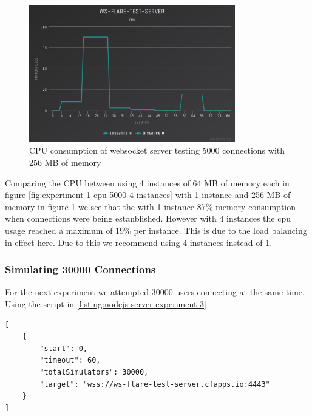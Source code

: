 \begin{figure}[H]
  \centering
    \includegraphics[width=0.8\textwidth]{figures/experiments/experiment-1/node-js/cpu-5000-256-memory.png}
    \caption{CPU consumption of websocket server testing 5000 connections with 256 MB of memory}
    \label{fig:experiment-1-cpu-5000-1-instances-256-mem}
\end{figure}

Comparing the CPU between using 4 instances of 64 MB of memory each in figure \ref{fig:experiment-1-cpu-5000-4-instances} with 1 instance and 256 MB of memory in figure \ref{fig:experiment-1-cpu-5000-1-instances-256-mem} we see that the with 1 instance 87\% memory consumption when connections were being estanblished. However with 4 instances the cpu usage reached a maximum of 19\% per instance. This is due to the load balancing in effect here. Due to this we recommend using 4 instances instead of 1. 

\subsubsection{Simulating 30000 Connections}

For the next experiment we attempted 30000 users connecting at the same time. Using the script in \ref{listing:nodejs-server-experiment-3}

\begin{listing}[H]
    \caption{WS-Flare test script for 5000 users}
    \label{listing:nodejs-server-experiment-3}
    \begin{verbatim}
[
    {
        "start": 0,
        "timeout": 60,
        "totalSimulators": 30000,
        "target": "wss://ws-flare-test-server.cfapps.io:4443"
    }
]
\end{verbatim}
\end{listing}

